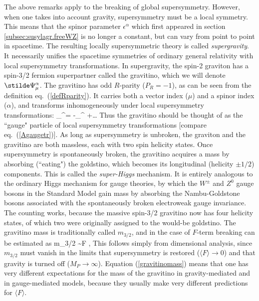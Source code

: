 The above remarks apply to the breaking of global supersymmetry.
However, when one takes into account gravity, supersymmetry must
be a local symmetry. This means that the spinor parameter
$\epsilon^\alpha$
which first appeared in section \ref{subsec:susylagr.freeWZ} is no longer
a constant,
but can vary from point to point in spacetime.
The resulting locally supersymmetric theory
is called {\it supergravity}.\cite{supergravity1,supergravity2} It
necessarily unifies the
spacetime symmetries of ordinary general relativity
with local supersymmetry
transformations. In supergravity,
the spin-2 graviton has a spin-3/2 fermion superpartner
called the gravitino, which we will denote $\stilde \Psi_\mu^\alpha$.
The gravitino has odd
$R$-parity ($P_R=-1$),
as can be seen from the definition eq.~(\ref{defRparity}). It carries both
a vector index ($\mu$)
and a spinor index ($\alpha$), and transforms inhomogeneously under local
supersymmetry transformations:
\beq
\delta \stilde\Psi_\mu^\alpha = -\partial_\mu\epsilon^\alpha
+\ldots
\eeq
Thus the gravitino should be thought of as the ``gauge" particle
of local supersymmetry transformations
[compare eq.~(\ref{Agaugetr})].
As long as supersymmetry is unbroken, the graviton and the gravitino
are both massless, each with two spin helicity states. Once
supersymmetry is spontaneously broken, the gravitino acquires a mass
by absorbing (``eating") the goldstino,
which becomes its longitudinal (helicity $\pm 1/2$) components.
This is called the {\it super-Higgs} mechanism. It is
entirely analogous to the ordinary Higgs mechanism for gauge
theories, by which the $W^\pm$ and $Z^0$ gauge bosons
in the Standard Model gain mass by absorbing the
Nambu-Goldstone bosons associated with the spontaneously broken
electroweak gauge
invariance. The counting works, because the massive spin-3/2 gravitino
now
has four helicity states, of which two were originally assigned to the
would-be goldstino.
The gravitino  mass is traditionally called $m_{3/2}$, and in the case of
$F$-term breaking can be estimated as \cite{gravitinomassref}
\beq
m_{3/2} \sim {\langle F \rangle \over \MPlanck},
\label{gravitinomass}
\eeq
This follows simply from dimensional analysis, since $m_{3/2}$ must vanish
in the limits that supersymmetry is restored ($\langle F \rangle
\rightarrow 0$) and that gravity is turned off ($M_P \rightarrow \infty$).
Equation (\ref{gravitinomass}) means that one has very different
expectations for the
mass of the gravitino in gravity-mediated and in gauge-mediated
models, because they usually make very different predictions for
$\langle F \rangle$.

